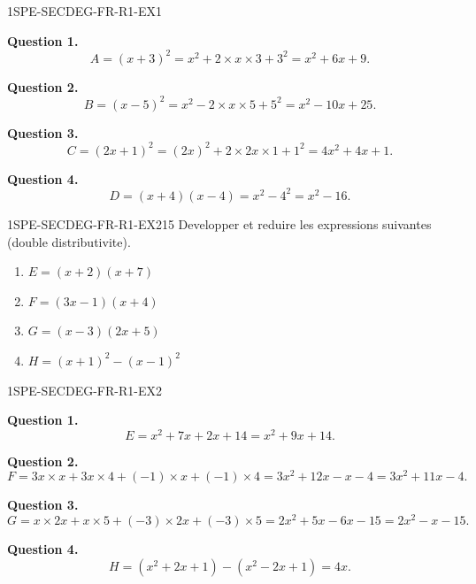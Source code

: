 \begin{corrige}{1SPE-SECDEG-FR-R1-EX1}


\textbf{Question 1.}
\[
A = (x + 3)^2 = x^2 + 2 \times x \times 3 + 3^2 = x^2 + 6x + 9.
\]


\textbf{Question 2.}
\[
B = (x - 5)^2 = x^2 - 2 \times x \times 5 + 5^2 = x^2 - 10x + 25.
\]


\textbf{Question 3.}
\[
C = (2x + 1)^2 = (2x)^2 + 2 \times 2x \times 1 + 1^2 = 4x^2 + 4x + 1.
\]


\textbf{Question 4.}
\[
D = (x + 4)(x - 4) = x^2 - 4^2 = x^2 - 16.
\]

\end{corrige}


\begin{exercice}{1SPE-SECDEG-FR-R1-EX2}{1}{5}
Developper et reduire les expressions suivantes (double distributivite).
\begin{enumerate}
  \item $E = (x + 2)(x + 7)$
  \item $F = (3x - 1)(x + 4)$
  \item $G = (x - 3)(2x + 5)$
  \item $H = (x + 1)^2 - (x - 1)^2$
\end{enumerate}
\end{exercice}


\begin{corrige}{1SPE-SECDEG-FR-R1-EX2}


\textbf{Question 1.}
\[
E = x^2 + 7x + 2x + 14 = x^2 + 9x + 14.
\]

\textbf{Question 2.}
\[
F = 3x \times x + 3x \times 4 + (-1) \times x + (-1) \times 4 = 3x^2 + 12x - x - 4 = 3x^2 + 11x - 4.
\]

\textbf{Question 3.}
\[
G = x \times 2x + x \times 5 + (-3) \times 2x + (-3) \times 5 = 2x^2 + 5x - 6x - 15 = 2x^2 - x - 15.
\]


\textbf{Question 4.}
\[
H = (x^2 + 2x + 1) - (x^2 - 2x + 1) = 4x.
\]

\end{corrige}

